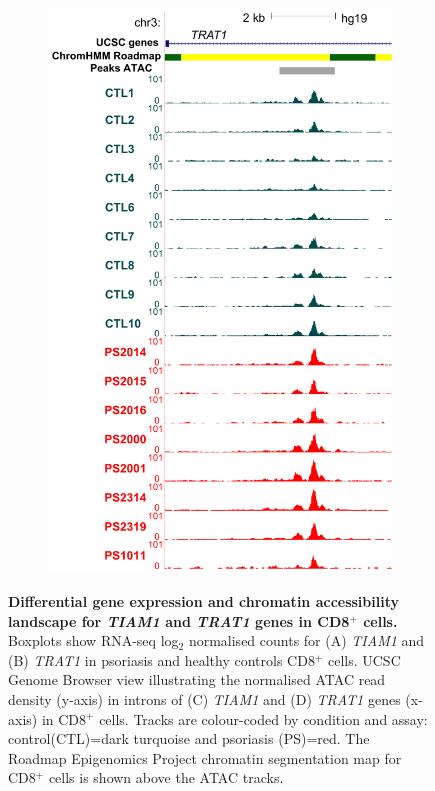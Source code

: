 \begin{figure}[htbp]
\begin{subfigure}{0.45\textwidth}
\includegraphics[width=\textwidth]{./Results2/pdfs/ATAC_CD8_peak_TRAT1_RNA_overlap}
\caption{\textbf{}}
\end{subfigure}
\caption[Differential gene expression and chromatin accessibility landscape for \textit{TIAM1} and \textit{TRAT1} genes in CD8$^+$ cells.]{\textbf{Differential gene expression and chromatin accessibility landscape for \textit{TIAM1} and \textit{TRAT1} genes in CD8$^+$ cells.} Boxplots show RNA-seq log$_{2}$ normalised counts for (A) \textit{TIAM1} and (B) \textit{TRAT1} in psoriasis and healthy controls CD8$^+$ cells. UCSC Genome Browser view illustrating the normalised ATAC read density (y-axis) in introns of (C) \textit{TIAM1} and (D) \textit{TRAT1} genes (x-axis) in CD8$^+$ cells. Tracks are colour-coded by condition and assay: control(CTL)=dark turquoise and psoriasis (PS)=red. The Roadmap Epigenomics Project chromatin segmentation map for CD8$^+$ cells is shown above the ATAC tracks.}
\label{figure:ATAC_RNAseq_CD8_TIAM1_TRAT1}
\end{figure}



